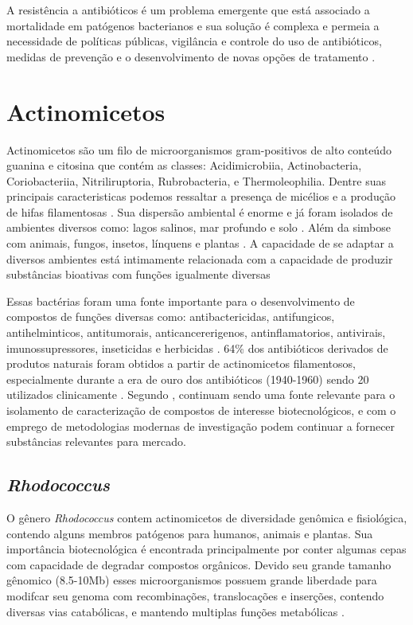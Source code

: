 A resistência a antibióticos é um problema emergente que está associado a mortalidade em patógenos bacterianos e sua solução
é complexa e permeia a necessidade de políticas públicas, vigilância e controle do uso de antibióticos, medidas de prevenção 
e o desenvolvimento de novas opções de tratamento \cite{frieri2017antibiotic}.  


\section{Actinomicetos}

Actinomicetos são um filo de microorganismos gram-positivos de alto conteúdo
guanina e citosina que contém as classes: Acidimicrobiia, Actinobacteria, 
Coriobacteriia, Nitriliruptoria, Rubrobacteria, e Thermoleophilia\cite{yadav2018}.
Dentre suas principais caracteristicas podemos ressaltar a presença de micélios
e a produção de hifas filamentosas \cite{chater2016}. Sua dispersão ambiental é enorme
e já foram isolados de ambientes diversos como: lagos salinos, mar profundo e solo \cite{flores2021,felicio2021,sapkota2020}.
Além da simbose com animais, fungos, insetos, línquens e plantas \cite{hei2021,van2017}.
A capacidade de se adaptar a diversos ambientes está intimamente relacionada com a capacidade
de produzir substâncias bioativas com funções igualmente diversas  \cite{van2020}

Essas bactérias foram uma fonte importante para o desenvolvimento de compostos de funções
diversas como: antibactericidas, antifungicos, antihelminticos, antitumorais, anticancererigenos,
antinflamatorios, antivirais, imunossupressores, inseticidas e herbicidas \cite{demain2009,jose2021}. 
64\% dos antibióticos derivados de produtos naturais foram obtidos a partir de actinomicetos filamentosos,
especialmente durante a era de ouro dos antibióticos (1940-1960) sendo 20 utilizados clinicamente \cite{hutchings2019} .
Segundo , continuam sendo uma fonte relevante
para o isolamento de caracterização de compostos de interesse biotecnológicos, e com o
emprego de metodologias modernas de investigação podem continuar a fornecer
substâncias relevantes para mercado. 


\subsection{\textit{Rhodococcus}}
O gênero \textit{Rhodococcus} contem actinomicetos de diversidade genômica e fisiológica,
contendo alguns membros patógenos para humanos, animais e plantas. Sua importância biotecnológica
é encontrada principalmente por conter algumas cepas com capacidade de degradar compostos orgânicos.
Devido seu grande tamanho gênomico (8.5-10Mb) esses microorganismos possuem grande liberdade
para modifcar seu genoma com recombinações, translocações e inserções, contendo diversas vias catabólicas,
e mantendo multiplas funções metabólicas \cite{cappelletti2019}.

